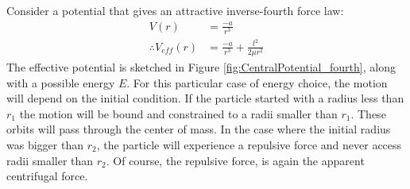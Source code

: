 Consider a potential that gives an attractive inverse-fourth force law:
\begin{align}
V(r)&=\frac{-a}{r^3}\nonumber\\
\therefore V_{eff}(r)&= \frac{-a}{r^3}+\frac{l^2}{2\mu r^2}
\end{align}
The effective potential is sketched in Figure \ref{fig:CentralPotential_fourth}, along with a possible energy $E$. For this particular case of energy choice, the motion will depend on the initial condition. If the particle started with a radius less than $r_1$ the motion will be bound and constrained to a radii smaller than $r_1$. These orbits will pass through the center of mass. In the case where the initial radius was bigger than $r_2$, the particle will experience a repulsive force and never access radii smaller than $r_2$. Of course, the repulsive force, is again the apparent centrifugal force.

